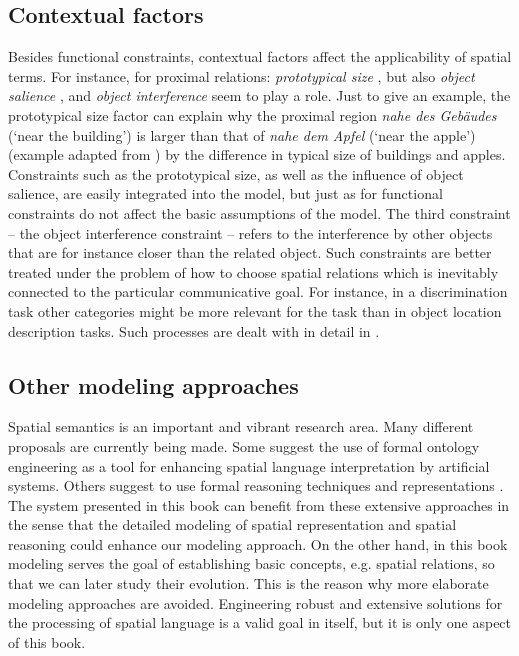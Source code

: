\subsection{Contextual factors}
Besides functional constraints, contextual factors affect the
applicability of spatial terms. For instance, for proximal relations: 
\emph{prototypical size} \citep{gapp1994basic}, but also 
\emph{object salience} \citep{regier2001grounding}, and \emph{object interference} 
\citep{kelleher2009dialog} seem to play a role.
Just to give an example, the prototypical size factor can explain
why the proximal region \textit{nahe des Geb\"audes}
(`near the building') is larger than that of \textit{nahe dem Apfel} (`near the apple') 
(example adapted from \citealp{gapp1994basic}) by the difference in typical 
size of buildings and apples. 
Constraints such as the prototypical size, as well as the influence of
object salience, are easily integrated into the model, but just as 
for functional constraints do not affect the basic assumptions
of the model. The third constraint -- the object interference constraint --
refers to the interference by other objects that are for
instance closer than the related object. Such constraints are better treated 
under the problem of how to choose spatial relations which is inevitably
connected to the particular communicative goal. 
For instance, in a discrimination task other categories
might be more relevant for the task than in object location description tasks.
Such processes are dealt with in detail in .


\subsection{Other modeling approaches}
Spatial semantics is an important and vibrant research area. 
Many different proposals are currently being made. Some suggest 
the use of formal ontology engineering \citep{bateman2007role,bateman2010situating,bateman2010ontology}
as a tool for enhancing spatial language interpretation by artificial 
systems. Others suggest to use formal reasoning techniques
and representations \citep{freksa1991qualitative,cohn2001qualitative}.
The system presented in this book can benefit from these
extensive approaches in the sense that the detailed modeling 
of spatial representation and spatial reasoning could enhance
our modeling approach. On the other hand, in this book modeling 
serves the goal of establishing basic concepts, e.g. spatial relations,
so that we can later study their evolution. This is the
reason why more elaborate modeling approaches are avoided. Engineering
robust and extensive solutions for the processing of spatial
language is a valid goal in itself, but it is only one aspect of 
this book.

